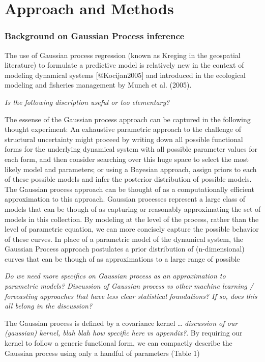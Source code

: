 \documentclass[author-year, review]{elsarticle} %
\begin{document}
\section{Approach and Methods}

\subsubsection{Background on Gaussian Process inference}

The use of Gaussian process regression (known as Kreging in the
geospatial literature) to formulate a predictive model is relatively new
in the context of modeling dynamical systems {[}@Kocijan2005{]} and
introduced in the ecological modeling and fisheries management by Munch
et al. (2005).

\emph{Is the following discription useful or too elementary?}

The essense of the Gaussian process approach can be captured in the
following thought experiment: An exhaustive parametric approach to the
challenge of structural uncertainty might proceed by writing down all
possible functional forms for the underlying dynamical system with all
possible parameter values for each form, and then consider searching
over this huge space to select the most likely model and parameters; or
using a Bayesian approach, assign priors to each of these possible
models and infer the posterior distribution of possible models. The
Gaussian process approach can be thought of as a computationally
efficient approximation to this approach. Gaussian processes represent a
large class of models that can be though of as capturing or reasonably
approximating the set of models in this collection. By modeling at the
level of the process, rather than the level of parametric equation, we
can more concisely capture the possible behavior of these curves. In
place of a parametric model of the dynamical system, the Gaussian
Process approach postulates a prior distribution of (n-dimensional)
curves that can be though of as approximations to a large range of
possible

\emph{Do we need more specifics on Gaussian process as an approximation
to parametric models? Discussion of Gaussian process vs other machine
learning / forecasting approaches that have less clear statistical
foundations? If so, does this all belong in the discussion?}

The Gaussian process is defined by a covariance kernel \ldots{}
\emph{discussion of our (gaussian) kernel, blah blah how specific here
vs appendix?}. By requiring our kernel to follow a generic functional
form, we can compactly describe the Gaussian process using only a
handful of parameters (Table 1)
\end{document}
